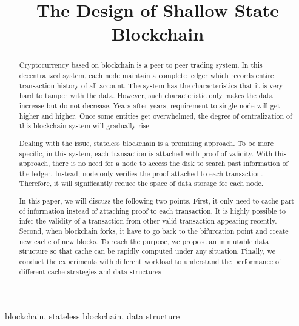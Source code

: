 \documentclass[conference]{IEEEtran}
\begin{document}
\title{The Design of Shallow State Blockchain}

\author{
}

\maketitle

\begin{abstract}
Cryptocurrency based on blockchain is a peer to peer trading system.
In this decentralized system, each node maintain a complete ledger which records entire transaction history of all account.
The system has the characteristics that it is very hard to tamper with the data.
However, such characteristic only makes the data increase but do not decrease.
Years after years, requirement to single node will get higher and higher.
Once some entities get overwhelmed, the degree of centralization of this blockchain system will gradually rise

Dealing with the issue, stateless blockchain is a promising approach.
To be more specific, in this system, each transaction is attached with proof of validity.
With this approach, there is no need for a node to access the disk to search past information of the ledger.
Instead, node only verifies the proof attached to each transaction.
Therefore, it will significantly reduce the space of data storage for each node.

In this paper, we will discuss the following two points.
First, it only need to cache part of information instead of attaching proof to each transaction.
It is highly possible to infer the validity of a transaction from other valid transaction appearing recently.
Second, when blockchain forks, it have to go back to the bifurcation point and create new cache of new blocks.
To reach the purpose, we propose an immutable data structure so that cache can be rapidly computed under any situation.
Finally, we conduct the experiments with different workload to understand the performance of different cache strategies and data structures
\end{abstract}

\begin{IEEEkeywords}
blockchain, stateless blockchain, data structure
\end{IEEEkeywords}
\end{document}
